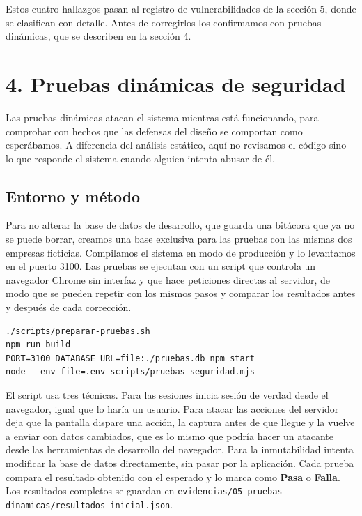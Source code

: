 \documentclass[12pt, letterpaper]{article}
\begin{document}
Estos cuatro hallazgos pasan al registro de vulnerabilidades de la sección 5, donde se clasifican con detalle. Antes de corregirlos los confirmamos con pruebas dinámicas, que se describen en la sección 4.

\section{4. Pruebas dinámicas de seguridad}

Las pruebas dinámicas atacan el sistema mientras está funcionando, para comprobar con hechos que las defensas del diseño se comportan como esperábamos. A diferencia del análisis estático, aquí no revisamos el código sino lo que responde el sistema cuando alguien intenta abusar de él.

\subsection{Entorno y método}

Para no alterar la base de datos de desarrollo, que guarda una bitácora que ya no se puede borrar, creamos una base exclusiva para las pruebas con las mismas dos empresas ficticias. Compilamos el sistema en modo de producción y lo levantamos en el puerto 3100. Las pruebas se ejecutan con un script que controla un navegador Chrome sin interfaz y que hace peticiones directas al servidor, de modo que se pueden repetir con los mismos pasos y comparar los resultados antes y después de cada corrección.

\begin{verbatim}
./scripts/preparar-pruebas.sh
npm run build
PORT=3100 DATABASE_URL=file:./pruebas.db npm start
node --env-file=.env scripts/pruebas-seguridad.mjs
\end{verbatim}

El script usa tres técnicas. Para las sesiones inicia sesión de verdad desde el navegador, igual que lo haría un usuario. Para atacar las acciones del servidor deja que la pantalla dispare una acción, la captura antes de que llegue y la vuelve a enviar con datos cambiados, que es lo mismo que podría hacer un atacante desde las herramientas de desarrollo del navegador. Para la inmutabilidad intenta modificar la base de datos directamente, sin pasar por la aplicación. Cada prueba compara el resultado obtenido con el esperado y lo marca como \textbf{Pasa} o \textbf{Falla}. Los resultados completos se guardan en \nolinkurl{evidencias/05-pruebas-dinamicas/resultados-inicial.json}.
\end{document}
